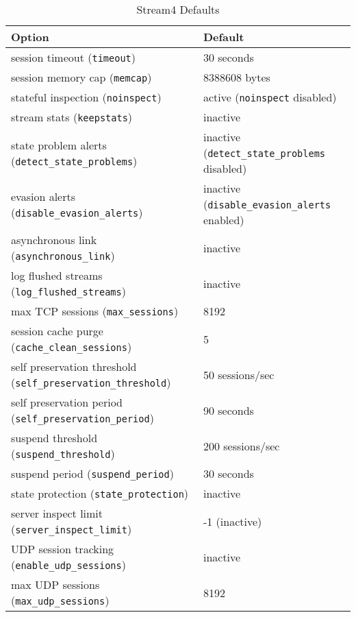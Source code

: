 \documentclass[english]{report}
\begin{document}
%
\begin{table}[!hbpt]

\caption{Stream4 Defaults\label{Stream4 Defaults}}

\begin{center}\begin{tabular}{| l | l |}
\hline 
\textbf{Option} &
\textbf{Default}\\
\hline
\hline 
session timeout (\texttt{timeout}) & 30 seconds\\
\hline 
session memory cap (\texttt{memcap}) & 8388608 bytes\\
\hline 
stateful inspection (\texttt{noinspect}) & active (\texttt{noinspect} disabled)\\
\hline 
stream stats (\texttt{keepstats}) & inactive\\
\hline 
state problem alerts (\texttt{detect\_state\_problems}) & inactive (\texttt{detect\_state\_problems} disabled)\\
\hline
evasion alerts (\texttt{disable\_evasion\_alerts})  & inactive (\texttt{disable\_evasion\_alerts} enabled)\\
\hline
asynchronous link (\texttt{asynchronous\_link}) & inactive\\
\hline
log flushed streams (\texttt{log\_flushed\_streams}) & inactive\\
\hline
max TCP sessions (\texttt{max\_sessions}) & 8192\\
\hline
session cache purge (\texttt{cache\_clean\_sessions}) & 5\\
\hline
self preservation threshold (\texttt{self\_preservation\_threshold}) & 50 sessions/sec\\
\hline
self preservation period (\texttt{self\_preservation\_period}) & 90 seconds\\
\hline
suspend threshold (\texttt{suspend\_threshold}) & 200 sessions/sec\\
\hline
suspend period (\texttt{suspend\_period}) & 30 seconds\\
\hline
state protection (\texttt{state\_protection}) & inactive\\
\hline
server inspect limit (\texttt{server\_inspect\_limit}) & -1 (inactive)\\
\hline
UDP session tracking (\texttt{enable\_udp\_sessions}) & inactive\\
\hline
max UDP sessions (\texttt{max\_udp\_sessions}) & 8192\\
\hline
\end{tabular}
\end{center}
\end{table}
\end{document}
